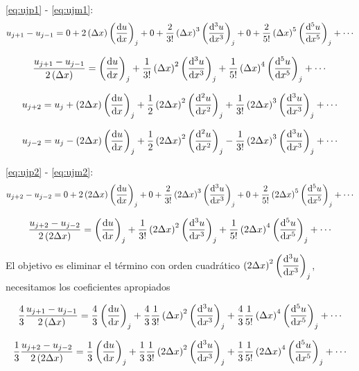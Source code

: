 \documentclass{article}
\begin{document}
\eqref{eq:ujp1} - \eqref{eq:ujm1}:
\begin{equation}
u_{j+1} - u_{j-1} = 0 + 2\Dx\derord{u}{x} + 0 +
\frac2{3!}\Dx^3\derord[3]{u}{x} + 0 +
\frac2{5!}\Dx^5\derord[5]{u}{x} + \cdots
\label{eq:ujp1mujm1}
\end{equation}

\begin{equation}
\frac{u_{j+1} - u_{j-1}}{2\Dx} = \derord{u}{x} +
\frac1{3!}\Dx^2\derord[3]{u}{x} +
\frac1{5!}\Dx^4\derord[5]{u}{x} + \cdots
\end{equation}


\begin{equation}
u_{j+2} = u_j + \dDx\derord{u}{x} +
\frac12\dDx^2\derord[2]{u}{x} +
\frac1{3!}\dDx^3\derord[3]{u}{x} + \cdots
\label{eq:ujp2}
\end{equation}

\begin{equation}
u_{j-2} = u_j - \dDx\derord{u}{x} +
\frac12\dDx^2\derord[2]{u}{x} -
\frac1{3!}\dDx^3\derord[3]{u}{x} + \cdots
\label{eq:ujm2}
\end{equation}

\eqref{eq:ujp2} - \eqref{eq:ujm2}:
\begin{equation}
u_{j+2} - u_{j-2} = 0 + 2\dDx\derord{u}{x} + 0 +
\frac2{3!}\dDx^3\derord[3]{u}{x} + 0 +
\frac2{5!}\dDx^5\derord[5]{u}{x} + \cdots
\label{eq:ujp2mujm2}
\end{equation}

\begin{equation}
\frac{u_{j+2} - u_{j-2}}{2\dDx} = \derord{u}{x} +
\frac1{3!}\dDx^2\derord[3]{u}{x} +
\frac1{5!}\dDx^4\derord[5]{u}{x} + \cdots
\label{eq:ujp2mujm2_s}
\end{equation}

El objetivo es eliminar el término con orden cuadrático
$\dDx^2\derord[3]{u}{x}$, 
necesitamos los coeficientes apropiados


\begin{equation}
\def\coef{\frac43}
\coef\frac{u_{j+1} - u_{j-1}}{2\Dx} = \coef\derord{u}{x} +
\coef\frac1{3!}\Dx^2\derord[3]{u}{x} +
\coef\frac1{5!}\Dx^4\derord[5]{u}{x} + \cdots
\label{eq:4tercios}
\end{equation}

\begin{equation}
\def\coef{\frac13}
\coef\frac{u_{j+2} - u_{j-2}}{2\dDx} = \coef\derord{u}{x} +
\coef\frac1{3!}\dDx^2\derord[3]{u}{x} +
\coef\frac1{5!}\dDx^4\derord[5]{u}{x} + \cdots
\label{eq:1tercio}
\end{equation}
\end{document}
